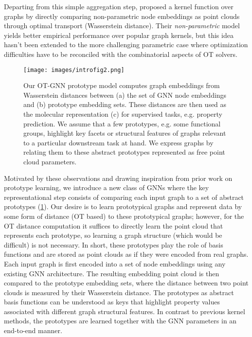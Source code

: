\documentclass[letterpaper]{article} \usepackage{aaai22}  \usepackage{times}  \usepackage{helvet}  \usepackage{courier}  \usepackage[hyphens]{url}  \usepackage{graphicx} \urlstyle{rm} \def\UrlFont{\rm}  \usepackage{natbib}  \usepackage{caption} \DeclareCaptionStyle{ruled}{labelfont=normalfont,labelsep=colon,strut=off} \frenchspacing  \setlength{\pdfpagewidth}{8.5in}  \setlength{\pdfpageheight}{11in}  \usepackage{algorithm}
\begin{document}
Departing from this simple aggregation step, \cite{togninalli2019wasserstein} proposed a kernel function over graphs by directly comparing non-parametric node embeddings as point clouds through optimal transport (Wasserstein distance). Their \textit{non-parametric} model yields better empirical performance over popular graph kernels, but this idea hasn't been extended to the more challenging parametric case where optimization difficulties have to be reconciled with the combinatorial aspects of OT solvers.

\begin{figure}
  \centering
  \texttt{[image: images/introfig2.png]}
  \caption{Our OT-GNN prototype model computes graph embeddings  from Wasserstein distances between (a) the set of GNN node embeddings and (b) prototype embedding sets. These distances are then used as the molecular representation (c) for supervised tasks, e.g. property prediction. We assume that a few prototypes, e.g. some functional groups, highlight key facets or structural features of graphs relevant to a particular downstream task at hand. We express graphs by relating them to these abstract prototypes represented as free point cloud parameters.}
  \label{fig:ot_protos}
\end{figure}

Motivated by these observations and drawing inspiration from prior work on prototype learning, we  introduce a new class of GNNs where the key representational step consists of comparing each input graph to a set of abstract prototypes (\cref{fig:ot_protos}). Our desire is to learn prototypical graphs and represent data by some form of distance (OT based) to these prototypical graphs; however, for the OT distance computation it suffices to directly learn the point cloud that represents each prototype, so learning a graph structure (which would be difficult) is not necessary. In short, these prototypes play the role of basis functions and are stored as point clouds as if they were encoded from real graphs.  Each input graph is first encoded into a set of node embeddings using any existing GNN architecture. The resulting embedding point cloud is then compared to the prototype embedding sets, where the distance between two point clouds is measured by their Wasserstein distance.  The prototypes as abstract basis functions can be understood as keys that highlight property values associated with different graph structural features. In contrast to previous kernel methods, the prototypes are learned together with the GNN parameters in an end-to-end manner. 
\end{document}
